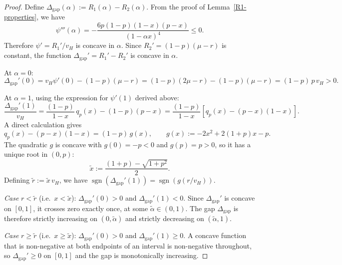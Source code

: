 \begin{proof}
    Define $\Delta_{\mathrm{gap}}(\alpha) := R_1(\alpha) - R_2(\alpha)$. From the proof of Lemma~\ref{R1-properties}, we have
    \begin{equation*}
        \psi'''(\alpha) = - \frac{6p(1-p)(1-x)(p-x)}{(1-\alpha x)^4} \leq 0.
    \end{equation*}
    Therefore $\psi' = R_1'/v_H$ is concave in $\alpha$. Since $R_2' = (1-p)(\mu - r)$ is constant, the function $\Delta_{\mathrm{gap}}' = R_1' - R_2'$ is concave in $\alpha$.

    

    \noindent At $\alpha = 0$:
    \begin{equation*}
        \Delta_{\mathrm{gap}}'(0) = v_H \psi'(0) - (1-p)(\mu - r) = (1-p)(2\mu - r) - (1-p)(\mu - r) = (1-p) \, p \, v_H > 0.
    \end{equation*}

    \noindent At $\alpha = 1$, using the expression for $\psi'(1)$ derived above:
    \begin{equation*}
        \frac{\Delta_{\mathrm{gap}}'(1)}{v_H} = \frac{(1-p)}{1-x} \, q_p(x) - (1-p)(p - x) = \frac{(1-p)}{1-x} \left[ q_p(x) - (p-x)(1-x) \right].
    \end{equation*}
    A direct calculation gives
    \begin{equation*}
        q_p(x) - (p-x)(1-x) = (1-p) \, g(x), \qquad g(x) := -2x^2 + 2(1+p)x - p.
    \end{equation*}
    The quadratic $g$ is concave with $g(0) = -p < 0$ and $g(p) = p > 0$, so it has a unique root in $(0,p)$:
    \begin{equation*}
        \tilde{x} := \frac{(1+p) - \sqrt{1+p^2}}{2}.
    \end{equation*}
    Defining $\tilde{r} := \tilde{x} \, v_H$, we have $\operatorname{sgn}\!\left(\Delta_{\mathrm{gap}}'(1)\right) = \operatorname{sgn}\!\left(g(r/v_H)\right)$.

    

    \noindent \textit{Case} $r < \tilde{r}$ (i.e.\ $x < \tilde{x}$): $\Delta_{\mathrm{gap}}'(0) > 0$ and $\Delta_{\mathrm{gap}}'(1) < 0$. Since $\Delta_{\mathrm{gap}}'$ is concave on $[0,1]$, it crosses zero exactly once, at some $\tilde{\alpha} \in (0,1)$. The gap $\Delta_{\mathrm{gap}}$ is therefore strictly increasing on $(0, \tilde{\alpha})$ and strictly decreasing on $(\tilde{\alpha}, 1)$.

    

    \noindent \textit{Case} $r \geq \tilde{r}$ (i.e.\ $x \geq \tilde{x}$): $\Delta_{\mathrm{gap}}'(0) > 0$ and $\Delta_{\mathrm{gap}}'(1) \geq 0$. A concave function that is non-negative at both endpoints of an interval is non-negative throughout, so $\Delta_{\mathrm{gap}}' \geq 0$ on $[0,1]$ and the gap is monotonically increasing.
\end{proof}

